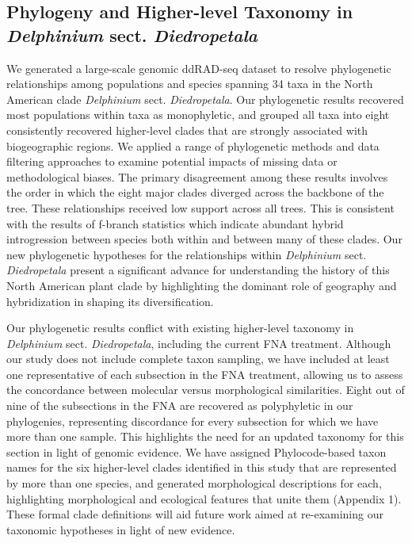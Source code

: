 \documentclass[11pt]{article}
\begin{document}
\subsection{Phylogeny and Higher-level Taxonomy in \emph{Delphinium} sect. \emph{Diedropetala}}
We generated a large-scale genomic ddRAD-seq dataset to resolve phylogenetic 
relationships among populations and species spanning 34 taxa in the North American 
clade \emph{Delphinium} sect. \emph{Diedropetala}.
% 
Our phylogenetic results recovered most populations within taxa as monophyletic, 
and grouped all taxa into eight consistently recovered higher-level clades 
that are strongly associated with biogeographic regions.
% 
We applied a range of phylogenetic methods and data filtering approaches to examine potential impacts of missing data or methodological biases.
% 
The primary disagreement among these results involves the order in which the
eight major clades diverged across the backbone of the tree. These relationships
received low support across all trees.
% 
This is consistent with the results of f-branch statistics which indicate abundant
hybrid introgression between species both within and between many of these clades.
% 
Our new phylogenetic hypotheses for the relationships within 
\emph{Delphinium} sect. \emph{Diedropetala} present a significant advance for 
understanding the history of this North American plant clade by highlighting the dominant role of geography and hybridization in shaping its diversification.


Our phylogenetic results conflict with existing higher-level taxonomy in 
\emph{Delphinium} sect. \emph{Diedropetala}, including the current FNA treatment.
% 
Although our study does not include complete taxon sampling, we have
included at least one representative of each subsection in the FNA treatment, 
allowing us to assess the concordance between molecular versus morphological 
similarities.
% 
Eight out of nine of the subsections in the FNA are recovered as polyphyletic
in our phylogenies, representing discordance for every subsection for which
we have more than one sample. This highlights the need for an updated taxonomy for this section in light of genomic evidence.
% 
We have assigned Phylocode-based taxon names for the six higher-level clades identified in this study that are represented by more than one species, and generated morphological descriptions for each, highlighting morphological and ecological features that unite them (Appendix 1). These formal clade definitions will aid future work aimed at re-examining our taxonomic hypotheses in light of new evidence.
\end{document}
